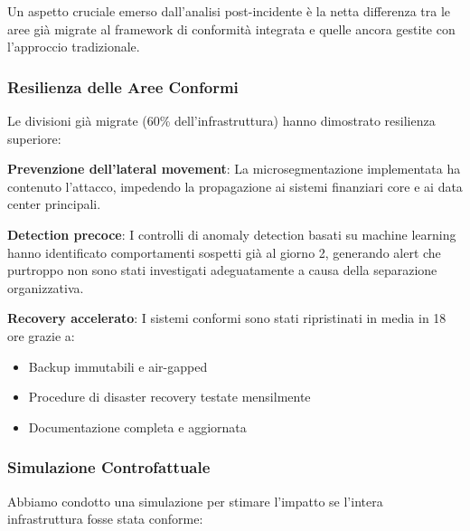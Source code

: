 Un aspetto cruciale emerso dall'analisi post-incidente è la netta differenza tra le aree già migrate al framework di conformità integrata e quelle ancora gestite con l'approccio tradizionale.

\subsubsection{\texorpdfstring{Resilienza delle Aree Conformi}{4.8.3.1 - Resilienza delle Aree Conformi}}

Le divisioni già migrate (60\% dell'infrastruttura) hanno dimostrato resilienza superiore:

\textbf{Prevenzione dell'lateral movement}: La microsegmentazione implementata ha contenuto l'attacco, impedendo la propagazione ai sistemi finanziari core e ai data center principali.

\textbf{Detection precoce}: I controlli di anomaly detection basati su machine learning hanno identificato comportamenti sospetti già al giorno 2, generando alert che purtroppo non sono stati investigati adeguatamente a causa della separazione organizzativa.

\textbf{Recovery accelerato}: I sistemi conformi sono stati ripristinati in media in 18 ore grazie a:
\begin{itemize}
    \item Backup immutabili e air-gapped
    \item Procedure di disaster recovery testate mensilmente  
    \item Documentazione completa e aggiornata
\end{itemize}

\subsubsection{\texorpdfstring{Simulazione Controfattuale}{4.8.3.2 - Simulazione Controfattuale}}

Abbiamo condotto una simulazione per stimare l'impatto se l'intera infrastruttura fosse stata conforme:

